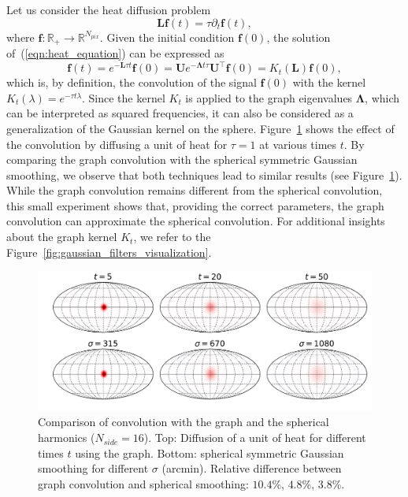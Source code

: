 \documentclass[final,twocolumn,3p,times,authoryear]{elsarticle}
\newcommand{\nati}[1]{{\color[rgb]{.1,.6,.1}{#1}}}
\newcommand{\todo}[1]{{\color[rgb]{.6,.1,.6}{#1}}}
\newcommand{\figref}[1]{Figure~\ref{fig:#1}}
\newcommand{\eqnref}[1]{(\ref{eqn:#1})}
\renewcommand{\b}[1]{{\bm{#1}}}   %
\newcommand{\1}{\b{1}}              %
\newcommand{\0}{\b{0}}              %
\newcommand{\g}[1]{\b{#1}}
\renewcommand{\L}{\b{L}}
\newcommand{\U}{\b{U}}
\newcommand{\trans}{^\intercal}
\newcommand{\R}{\mathbb{R}}
\newcommand{\bLambda}{\b{\Lambda}}
\begin{document}
Let us consider the heat diffusion problem
\begin{equation}
  \L \b{f}(t) = \tau \partial_t \b{f}(t),
  \label{eqn:heat_equation}
\end{equation}
where $\b{f}: \R_+ \rightarrow \R^{N_{pix}}$. Given the initial condition
$\b{f}(0)$, the solution of~\eqnref{heat_equation} can be expressed as
\begin{equation*}
  \b{f}(t) = e^{-\L \tau t} \b{f}(0) = \U e^{-\bLambda t \tau} \U\trans \g{f}(0) = K_t(\L) \b{f}(0),
\end{equation*}
which is, by definition, the convolution of the signal $\b{f}(0)$ with the kernel $K_t(\lambda)=e^{-\tau t \lambda}$. Since the kernel $K_t$ is applied to the graph eigenvalues $\bLambda$, which can be interpreted as squared frequencies, it can also be considered as a generalization of the Gaussian kernel on the sphere. \figref{gaussian_filters_comparizon} shows the effect of the convolution by diffusing a unit of heat for $\tau=1$ at various times $t$. By comparing the graph convolution with the spherical symmetric Gaussian smoothing, we observe that both techniques lead to similar results (see \figref{gaussian_filters_comparizon}). While the graph convolution remains different from the spherical convolution, this small experiment shows that, providing the correct parameters, the graph convolution can approximate the spherical convolution. For additional insights about the graph kernel $K_t$, we refer to the \figref{gaussian_filters_visualization}.

\begin{figure}
  \centering
  \includegraphics[width=\linewidth]{gaussian_filters_sphere}
  \caption{Comparison of convolution with the graph and the spherical harmonics ($N_{side} = 16$).
  Top: Diffusion of a unit of heat for different times $t$ using the graph.
  Bottom: spherical symmetric Gaussian smoothing for different $\sigma$ (arcmin).
  Relative difference between graph convolution and spherical smoothing: $10.4$\%, $4.8$\%, $3.8$\%.
}
  \label{fig:gaussian_filters_comparizon}
\end{figure}
\end{document}
